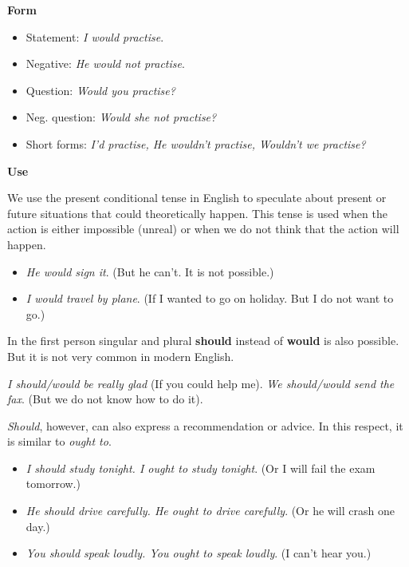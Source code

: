 \textbf{Form}

\begin{itemize}

\item Statement: \textit{I would practise}.
\item Negative: \textit{He would not practise}.
\item Question: \textit{Would you practise?}
\item Neg. question: \textit{Would she not practise?}
\item Short forms: \textit{I'd practise, He wouldn't practise, Wouldn't we practise?}

\end{itemize}

\textbf{Use}

We use the present conditional tense in English to speculate about present or future situations that could theoretically happen. This tense is used when the action is either impossible (unreal) or when we do not think that the action will happen.

\begin{itemize}

\item \textit{He would sign it}. (But he can't. It is not possible.) 
\item \textit{I would travel by plane}. (If I wanted to go on holiday. But I do not want to go.)

\end{itemize}

In the first person singular and plural \textbf{should} instead of \textbf{would} is also possible. But it is not very common in modern English.

\textit{I should/would be really glad} (If you could help me). \textit{We should/would send the fax}. (But we do not know how to do it).

\textit{Should}, however, can also express a recommendation or advice. In this respect, it is similar to \textit{ought to}.

\begin{itemize}

\item \textit{I should study tonight. I ought to study tonight}. (Or I will fail the exam tomorrow.)
\item \textit{He should drive carefully. He ought to drive carefully}. (Or he will crash one day.)
\item \textit{You should speak loudly. You ought to speak loudly}. (I can't hear you.)

\end{itemize}

